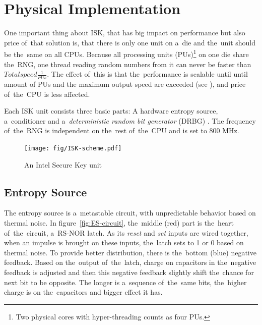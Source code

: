\section{Physical Implementation}\label{sec:ISK-physical}
\par{
One important thing about ISK, that has big impact on performance but also price 
of~that solution is, that there is only one unit on a~die and the~unit should be
 the~same on all CPUs. %
Because all processing units (PUs)\footnote{Two physical cores with 
hyper-threading counts as four PUs.} on one die share the~RNG, one thread 
reading random numbers from it can never be faster than 
$Total speed  \frac{1}{PUs}$. The effect of~this is that the~performance is
 scalable until until amount of PUs and the maximum output speed are exceeded 
 (see ), and price of~the~CPU is less 
 affected.
}

\par{
Each ISK unit consists three basic parts: A hardware entropy source, 
a~conditioner and a~{\em deterministic random bit generator} (DRBG)
\cite{IntelDRNGGuide}. The frequency of~the~RNG is independent 
on the~rest of~the~CPU and is set to 800 MHz. 
}
\begin{figure}[h!]
  \centering
 \texttt{[image: fig/ISK-scheme.pdf]} %
\caption{An Intel Secure Key unit}
\label{fig:ISK-unit}
\end{figure}


\subsection{Entropy Source}
\par{
The entropy source is a~metastable circuit, with unpredictable behavior based 
on thermal noise\cite{UnderstandingRdRandElectronic}. 
In figure~\ref{fig:ES-circuit}, the~middle (red) part is the~heart 
of~the~circuit, a~RS-NOR latch. As its {\em reset} and {\em set} inputs 
are wired together, when an impulse is brought on these inputs, the~latch sets 
to 1 or 0 based on thermal noise. To provide better distribution, there is 
the~bottom (blue) negative feedback. Based on the~output of~the~latch, charge 
on capacitors in the~negative feedback is adjusted and then this negative 
feedback slightly shift the~chance for next bit to be opposite. The longer 
is a~sequence of~the~same bits, the~higher charge is on the~capacitors 
and bigger effect it has.
}


